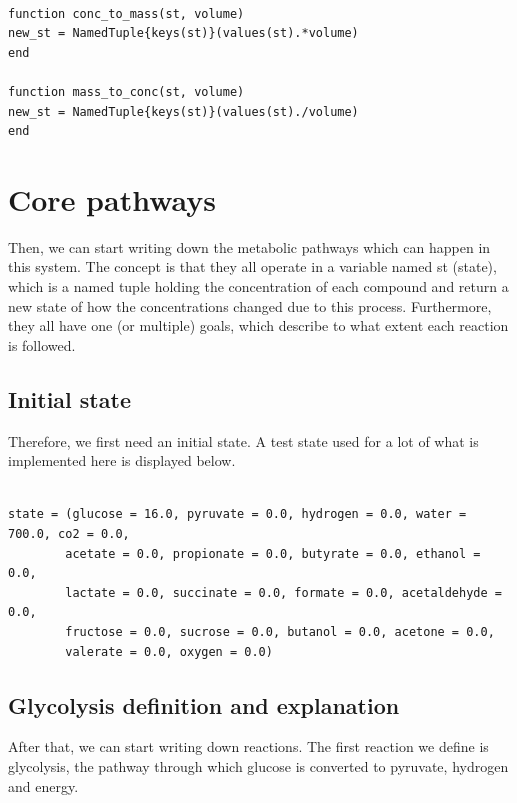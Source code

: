 \documentclass[11pt]{article}
\begin{document}
\begin{verbatim}

function conc_to_mass(st, volume)
new_st = NamedTuple{keys(st)}(values(st).*volume)
end

function mass_to_conc(st, volume)
new_st = NamedTuple{keys(st)}(values(st)./volume)
end

\end{verbatim}

\section{Core pathways}
\label{sec:org6a77985}
Then, we can start writing down the metabolic pathways which can happen in this system. The concept is that they all operate in a variable named st (state), which is a named tuple holding the concentration of each compound and return a new state of how the concentrations changed due to this process. Furthermore, they all have one (or multiple) goals, which describe to what extent each reaction is followed.

\subsection{Initial state}
\label{sec:org1fd0c50}
Therefore, we first need an initial state. A test state used for a lot of what is implemented here is displayed below.

\begin{verbatim}

state = (glucose = 16.0, pyruvate = 0.0, hydrogen = 0.0, water = 700.0, co2 = 0.0,
        acetate = 0.0, propionate = 0.0, butyrate = 0.0, ethanol = 0.0,
        lactate = 0.0, succinate = 0.0, formate = 0.0, acetaldehyde = 0.0,
        fructose = 0.0, sucrose = 0.0, butanol = 0.0, acetone = 0.0,
        valerate = 0.0, oxygen = 0.0)

\end{verbatim}

\subsection{Glycolysis definition and explanation}
\label{sec:org71f81c7}
After that, we can start writing down reactions. The first reaction we define is glycolysis, the pathway through which glucose is converted to pyruvate, hydrogen and energy. 
\end{document}

